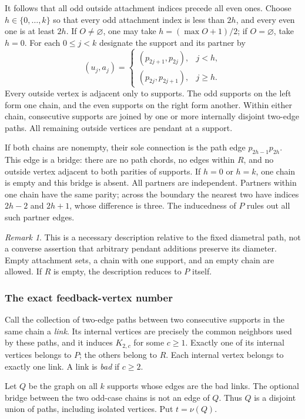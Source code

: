 \documentclass[11pt,a4paper]{article}
\theoremstyle{definition}\newtheorem{definition}[theorem]{Definition}
\theoremstyle{remark}\newtheorem{remark}[theorem]{Remark}
\begin{document}
It follows that all odd outside attachment indices precede all even
ones. Choose $h\in\{0,\ldots,k\}$ so that every odd attachment index is
less than $2h$, and every even one is at least $2h$. If $O\ne\varnothing$,
one may take $h=(\max O+1)/2$; if $O=\varnothing$, take $h=0$.
For each $0\le j<k$ designate the support and its partner by
\[
 (u_j,a_j)=
 \begin{cases}
 (p_{2j+1},p_{2j}),&j<h,\\
 (p_{2j},p_{2j+1}),&j\ge h.
 \end{cases}
\]
Every outside vertex is adjacent only to supports. The odd supports on
the left form one chain, and the even supports on the right form another.
Within either chain, consecutive supports are joined by one or more
internally disjoint two-edge paths. All remaining outside vertices are
pendant at a support.

If both chains are nonempty, their sole connection is the path edge
$p_{2h-1}p_{2h}$. This edge is a bridge: there are no path chords, no
edges within $R$, and no outside vertex adjacent to both parities of
supports. If $h=0$ or $h=k$, one chain is empty and this bridge is absent.
All partners are independent. Partners within one chain have the same
parity; across the boundary the nearest two have indices $2h-2$ and
$2h+1$, whose difference is three. The inducedness of $P$ rules out all
such partner edges.

\begin{remark}\label{late:geodesic:rem:structure}
This is a necessary description relative to the fixed diametral path,
not a converse assertion that arbitrary pendant additions preserve its
diameter. Empty attachment sets, a chain with one support, and an empty
chain are allowed. If $R$ is empty, the description reduces to $P$ itself.
\end{remark}

\subsubsection{The exact feedback-vertex number}
Call the collection of two-edge paths between two consecutive supports
in the same chain a \emph{link}. Its internal vertices are precisely the
common neighbors used by these paths, and it induces $K_{2,c}$ for some
$c\ge1$. Exactly one of its internal vertices belongs to $P$; the others
belong to $R$. Each internal vertex belongs to exactly one link.
A link is \emph{bad} if $c\ge2$.

Let $Q$ be the graph on all $k$ supports whose edges are the bad links.
The optional bridge between the two odd-case chains is not an edge of
$Q$. Thus $Q$ is a disjoint union of paths, including isolated vertices.
Put $t=\nu(Q)$.
\end{document}
